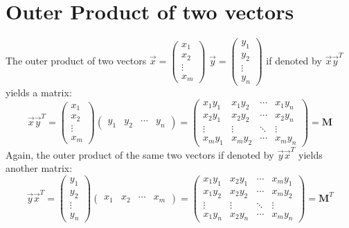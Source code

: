 \documentclass[conference,final,11pt,technote,onecolumn]{IEEEtran}\usepackage[]{graphicx}\usepackage[]{color}
\begin{document}
\section{Outer Product of two vectors}
\label{term:outer_product}
The outer product of two vectors $\vec x = \begin{pmatrix}x_1\\x_2\\\vdots\\x_m\end{pmatrix}$ $\vec y=\begin{pmatrix}y_1\\y_2\\\vdots\\y_n\end{pmatrix}$ if denoted by $\vec x\vec y^T$ yields a matrix:
\[ 
\vec x \vec y^T = \begin{pmatrix}x_1\\x_2\\\vdots\\x_m\end{pmatrix}\begin{pmatrix}y_1 & y_2& \cdots & y_n\end{pmatrix} = \begin{pmatrix} 
x_1y_1 & x_1y_2&\cdots&x_1y_n\\
x_2y_1 & x_2y_2&\cdots&x_2y_n\\
\vdots & \vdots & \ddots & \vdots\\
x_my_1 & x_my_2 & \cdots & x_my_n
\end{pmatrix} = \mathbf{M}
\]
Again, the outer product of the same two vectors if denoted by $\vec y\vec x^T$ yields another matrix:
\[ 
\vec y \vec x^T = \begin{pmatrix}y_1\\y_2\\\vdots\\y_n\end{pmatrix}\begin{pmatrix}x_1 &x_2& \cdots & x_m\end{pmatrix} = \begin{pmatrix} 
x_1y_1 & x_2y_1&\cdots&x_my_1\\
x_1y_2 & x_2y_2&\cdots&x_my_2\\
\vdots & \vdots & \ddots & \vdots\\
x_1y_n & x_2y_n & \cdots & x_my_n
\end{pmatrix} = \mathbf{M}^T
\]
\end{document}
